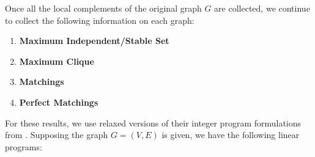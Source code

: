 \documentclass[12pt]{report} %
\begin{document}
\newpage 

Once all the local complements of the original graph $G$ are collected, we continue to 
collect the following information on each graph: 

\begin{enumerate}[label=(\roman*), font=\itshape]
    \item \textbf{Maximum Independent/Stable Set}
    \item \textbf{Maximum Clique}
    \item \textbf{Matchings}
    \item \textbf{Perfect Matchings}
\end{enumerate}

For these results, we use relaxed versions of their integer program formulations from \cite{conforti2014integer}. Supposing the graph $G = (V, E)$ is given, 
we have the following linear programs: 

\vspace{1em}
\end{document}
